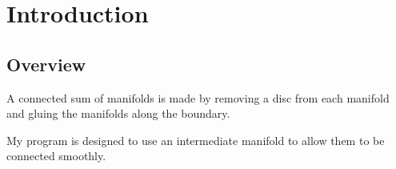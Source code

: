 \section{Introduction}

\subsection{Overview}

A connected sum of manifolds is made by removing a disc from each manifold and gluing the manifolds along the boundary.


My program is designed to use an intermediate manifold to allow them to be connected smoothly.


\begin{figure}[h]
\end{figure}
